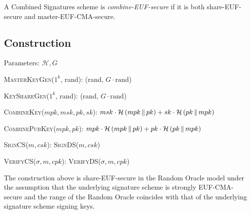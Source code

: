     \begin{definition}
      A Combined Signatures scheme is \emph{\textsf{combine-EUF}-secure} if it
      is both \textsf{share-EUF}-secure and \textsf{master-EUF-CMA}-secure.
    \end{definition}

  \subsection{Construction}
    Parameters: $\mathcal{H}, G$
    \begin{algorithmic}[0]
      \State \textsc{MasterKeyGen}($1^k$, rand):
      \Indent
        \State \Return (rand, $G \cdot \mathrm{rand}$)
      \EndIndent
    \end{algorithmic}

    \begin{algorithmic}[0]
      \State \textsc{KeyShareGen}($1^k$, rand):
      \Indent
        \State \Return (rand, $G \cdot \mathrm{rand}$)
      \EndIndent
    \end{algorithmic}

    \begin{algorithmic}[0]
      \State \textsc{CombineKey}($mpk, msk, pk, sk$):
      \Indent
        \State \Return $msk \cdot \mathcal{H}\left(mpk \,\|\, pk\right) + sk
        \cdot \mathcal{H}\left(pk \,\|\, mpk\right)$
      \EndIndent
    \end{algorithmic}

    \begin{algorithmic}[0]
      \State \textsc{CombinePubKey}($mpk, pk$):
      \Indent
        \State \Return $mpk \cdot \mathcal{H}\left(mpk \,\|\, pk\right) + pk
        \cdot \mathcal{H}\left(pk \,\|\, mpk\right)$
      \EndIndent
    \end{algorithmic}

    \begin{algorithmic}[0]
      \State \textsc{SignCS}($m, csk$):
      \Indent
        \State \Return \textsc{SignDS}($m, csk$)
      \EndIndent
    \end{algorithmic}

    \begin{algorithmic}[0]
      \State \textsc{VerifyCS}($\sigma, m, cpk$):
      \Indent
        \State \Return \textsc{VerifyDS}($\sigma, m, cpk$)
      \EndIndent
    \end{algorithmic}

    \begin{lemma}
      \label{lemma:comb:share}
      The construction above is \textsf{share-EUF}-secure in the Random Oracle
      model under the assumption that the underlying signature scheme is
      strongly \textsf{EUF-CMA}-secure and the range of the Random Oracle
      coincides with that of the underlying signature scheme signing keys.
    \end{lemma}

